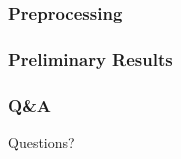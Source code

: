 \documentclass{beamer}
\begin{document}
\begin{frame}[fragile]
   \frametitle{Preprocessing}

\end{frame}


\begin{frame}[fragile]
   \frametitle{Preliminary Results}

\end{frame}


\begin{frame}[fragile]
  \frametitle{Q\&A}
	\begin{center}
		Questions?
	\end{center} 
\end{frame}
\end{document}
